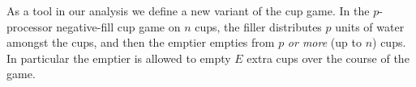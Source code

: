 

As a tool in our analysis we define a new variant of the cup
game. In the $p$-processor  negative-fill cup
game on $n$ cups, the filler distributes $p$ units of water
amongst the cups, and then the emptier empties from $p$
\textit{or more} (up to $n$) cups. In particular the emptier is
allowed to empty $E$ extra cups over the course of the game.

